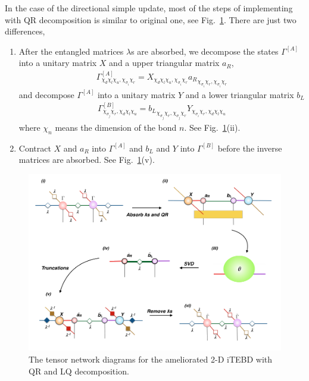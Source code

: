 In the case of the directional simple update, most of the steps of implementing with QR decomposition is similar to original one, see Fig.~\ref{fig319}. There are just two differences, 
\begin{enumerate}
	\item After the entangled matrices $\lambda$s are absorbed, we decompose the states $\Gamma^{[A]}$ into a unitary matrix $X$ and a upper triangular matrix $a_R$,
		\begin{align}
			\Gamma^{[A]}_{\chi_d \chi_l \chi_u, \chi_{\sigma_i} \chi_r} = X_{\chi_d \chi_l \chi_u, \chi_{\sigma_i} \chi_r} {a_R}_{\chi_{\sigma_i} \chi_r,\chi_{\sigma_i} \chi_r}
		\end{align}
		and decompose $\Gamma^{[A]}$ into a unitary matrix $Y$ and a lower triangular matrix $b_L$
		\begin{align}
			\Gamma^{[B]}_{\chi_{\sigma_j} \chi_r, \chi_d \chi_l \chi_u} = {b_L}_{\chi_{\sigma_j} \chi_r,\chi_{\sigma_j} \chi_r} Y_{\chi_{\sigma_i} \chi_r, \chi_d \chi_l \chi_u} 
		\end{align}
		where $\chi_n$ means the dimension of the bond $n$. See Fig.~\ref{fig319}(ii).
	\item Contract $X$ and $a_R$ into $\Gamma^{[A]}$ and $b_L$ and $Y$ into $\Gamma^{[B]}$ before the inverse matrices are absorbed. See Fig.~\ref{fig319}(v).

\end{enumerate}
\begin{figure}[H] 
	\centering 
	\includegraphics[width=1.00\textwidth]{figures/fig318.png} 
	\caption[The tensor network diagrams for the ameliorated 2-D iTEBD with QR decomposition]{The tensor network diagrams for the ameliorated 2-D iTEBD with QR and LQ decomposition.} 
	\label{fig319} 
\end{figure} 


